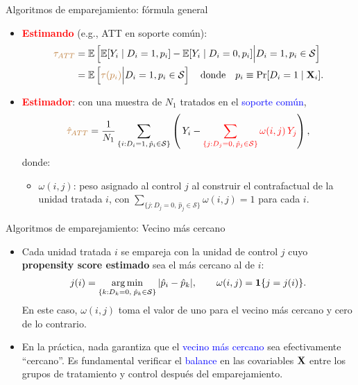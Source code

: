 \documentclass[10pt, xcolor=dvipsnames]{beamer}
\begin{document}
\begin{frame}{Algoritmos de emparejamiento: fórmula general}
\begin{itemize}
    \item \textcolor{red}{\textbf{Estimando}} (e.g., ATT en soporte común):
    \vspace{-0.4em}
    \begin{align*}
        \begin{split}
        \textcolor{brown}{\tau_{ATT}} 
        &= \operatorname{\mathbb{E}}\left[\operatorname{\mathbb{E}}[Y_i \mid D_i=1, p_i] - \operatorname{\mathbb{E}}[Y_i \mid D_i=0, p_i]\Big| D_i=1, p_i \in \mathcal{S} \right] \\
        &= \operatorname{\mathbb{E}}\left[\textcolor{brown}{\tau(p_i)}\Big| D_i=1, p_i \in \mathcal{S} \right] \quad \text{donde} \quad p_i \equiv \Pr[D_i=1 \mid \textbf{X}_i].
                \end{split}
    \end{align*}
    \item \textcolor{red}{\textbf{Estimador}}: con una muestra de \(N_1\) tratados en el \textcolor{blue}{soporte común},
    \vspace{-0.7em}
    \[
        \textcolor{brown}{\hat{\tau}_{ATT}} 
        = \frac{1}{N_1}\sum_{\{i: D_i=1,\, \hat{p}_i \in \mathcal{S}\}} 
        \left(\, Y_i - \textcolor{red}{\sum_{\{j: D_j=0,\, \hat{p}_j \in \mathcal{S}\}} 
        \omega(i,j) \, Y_j} \right),
    \]
    donde:
    \begin{itemize}
        \item \(\omega(i,j)\): peso asignado al control \(j\) al construir el contrafactual de la unidad tratada \(i\), con \(\sum_{\{j: D_j=0,\, \hat{p}_j \in \mathcal{S}\}} \omega(i,j) = 1\) para cada \(i\).
    \end{itemize}
\end{itemize}
\end{frame}


\begin{frame}{Algoritmos de emparejamiento: Vecino más cercano}
\begin{itemize}
	\item Cada unidad tratada $i$ se empareja con la unidad de control $j$ cuyo \textbf{propensity score estimado} sea el más cercano al de $i$:
    \begin{align*}
        j(i)=\argmin_{\{k: D_k=0,\; \hat{p}_k \in \mathcal{S}\}} |\hat{p}_i-\hat{p}_k|, 
        \qquad
        \omega(i,j)=\mathbf{1}\{j=j(i)\}.
    \end{align*}
    En este caso, $\omega(i,j)$ toma el valor de uno para el vecino más cercano y cero de lo contrario. 
    \vspace{0.5em}
    \item En la práctica, nada garantiza que el \textcolor{blue}{vecino más cercano} sea efectivamente ``cercano''. Es fundamental verificar el \textcolor{blue}{balance} en las covariables $\textbf{X}$ entre los grupos de tratamiento y control después del emparejamiento.
\end{itemize}
\end{frame}
\end{document}
